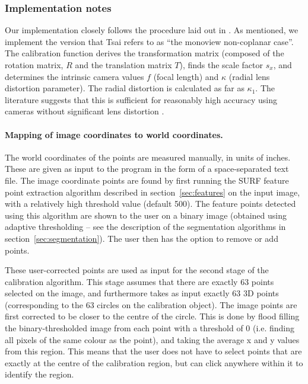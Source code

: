 \subsubsection{Implementation notes}
Our implementation closely follows the procedure laid out in
\cite{TSAI}. As mentioned, we implement the version that Tsai refers to
as ``the monoview non-coplanar case''. The calibration function derives
the transformation matrix (composed of the rotation matrix, $R$ and
the translation matrix $T$), finds the scale factor $s_x$, and determines the
intrinsic camera values $f$ (focal length) and $\kappa$ (radial
lens distortion parameter). The radial distortion is calculated as far as
$\kappa_1$. The literature suggests that this is sufficient for
reasonably high accuracy using cameras without significant lens
distortion \cite{algebraic-distortion}.

\paragraph{Mapping of image coordinates to world coordinates.}
The world coordinates of the points are measured manually, in units of
inches. These are given as input to the program in the form of a
space-separated text file. The image coordinate points are found by
first running the SURF feature point extraction algorithm described in
section~\ref{sec:features} on the input image, with a relatively high
threshold value (default 500). The feature points detected using this
algorithm are shown to the user on a binary image (obtained using
adaptive thresholding -- see the description of the segmentation
algorithms in section~\ref{sec:segmentation}). The user then has the option
to remove or add points.

These user-corrected points are used as input for the second stage of the
calibration algorithm. This stage assumes that there are exactly 63
points selected on the image, and furthermore takes as input exactly
63 3D points (corresponding to the 63 circles on the calibration
object). The image points are first corrected to be closer to the
centre of the circle. This is done by flood filling the binary-thresholded image
from each point with a threshold of 0 (i.e. finding all pixels of the
same colour as the point), and taking the average x and y values from
this region. This means that the user does not have to select points
that are exactly at the centre of the calibration region, but can
click anywhere within it to identify the region.

